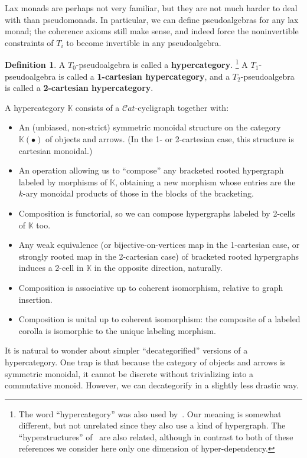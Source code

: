 \documentclass{article}
\theoremstyle{definition}
\newtheorem{defn}[thm]{Definition}
\theoremstyle{remark}
\def\K{\mathbb{K}}
\def\Cat{\ensuremath{\mathcal{C}\mathit{at}}}
\begin{document}
Lax monads are perhaps not very familiar, but they are not much harder to deal with than pseudomonads.
In particular, we can define pseudoalgebras for any lax monad; the coherence axioms still make sense, and indeed force the noninvertible constraints of $T_i$ to become invertible in any pseudoalgebra.

\begin{defn}
  A $T_0$-pseudoalgebra is called a \textbf{hypercategory}.%
  \footnote{The word ``hypercategory'' was also used by~\cite{hmt:strict-n-hypercats,mt:omega-hypergraphs}.
    Our meaning is somewhat different, but not unrelated since they also use a kind of hypergraph.
    The ``hyperstructures'' of~\cite{baas:higher-structures} are also related, although in contrast to both of these references we consider here only one dimension of hyper-dependency.}
  A $T_1$-pseudo\-algebra is called a \textbf{1-cartesian hypercategory}, and a $T_2$-pseudoalgebra is called a \textbf{2-cartesian hypercategory}.
\end{defn}

A hypercategory $\K$ consists of a $\Cat$-cycligraph together with:
\begin{itemize}
\item An (unbiased, non-strict) symmetric monoidal structure on the category $\K(\bullet)$ of objects and arrows.
  (In the 1- or 2-cartesian case, this structure is cartesian monoidal.)
\item An operation allowing us to ``compose'' any bracketed rooted hypergraph labeled by morphisms of $\K$, obtaining a new morphism whose entries are the $k$-ary monoidal products of those in the blocks of the bracketing.
\item Composition is functorial, so we can compose hypergraphs labeled by 2-cells of $\K$ too.
\item Any weak equivalence (or bijective-on-vertices map in the 1-cartesian case, or strongly rooted map in the 2-cartesian case) of bracketed rooted hypergraphs induces a 2-cell in $\K$ in the opposite direction, naturally.
\item Composition is associative up to coherent isomorphism, relative to graph insertion.
\item Composition is unital up to coherent isomorphism: the composite of a labeled corolla is isomorphic to the unique labeling morphism.
\end{itemize}

It is natural to wonder about simpler ``decategorified'' versions of a hypercategory.
One trap is that because the category of objects and arrows is symmetric monoidal, it cannot be discrete without trivializing into a commutative monoid.
However, we can decategorify in a slightly less drastic way.
\end{document}
